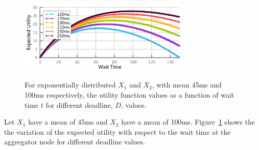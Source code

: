 \documentclass[letterpaper,twocolumn,10pt]{article}
\begin{document}
\begin{figure}[t]
\centering
\includegraphics[width=3.2in]{Matplotlib/UtilityAnalytical.pdf}
\label{figure:UtilityAnalytical}
\caption{\small For exponentially distributed $X_1$ and $X_2$, with mean 45ms and 100ms respectively, the utility function values as a function of wait time $t$ for different deadline, $D$, values.}
\end{figure}


Let $X_1$ have a mean of 45ms and $X_2$ have a mean of 100ms. 
Figure~\ref{figure:UtilityAnalytical} shows the the variation of the expected utility with respect to the wait time at the aggregator node for different deadline values. 


{\footnotesize 
}


\theendnotes
\end{document}
